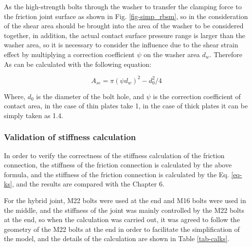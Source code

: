 As the high-strength bolts through the washer to transfer the clamping force to the friction joint surface as shown in Fig. \ref{fig-simp_rbsm}, so in the consideration of the shear area should be brought into the area of the washer to be considered together, in addition, the actual contact surface pressure range is larger than the washer area, so it is necessary to consider the influence due to the shear strain effect by multiplying a correction coefficient $\psi$ on the washer area $d_w$.
Therefore As can be calculated with the following equation:

\begin{equation}
    A_{se} = \pi{(\psi d_w)^2-d_0^2} / 4
\end{equation}

Where, $d_0$ is the diameter of the bolt hole, and $\psi$ is the correction coefficient of contact area, in the case of thin plates take 1, in the case of thick plates it can be simply taken as 1.4.

\subsubsection{Validation of stiffness calculation}

In order to verify the correctness of the stiffness calculation of the friction connection, the stiffness of the friction connection is calculated by the above formula, and the stiffness of the friction connection is calculated by the Eq. \ref{eq-ks}, and the results are compared with the Chapter 6. 

For the hybrid joint, M22 bolts were used at the end and M16 bolts were used in the middle, and the stiffness of the joint was mainly controlled by the M22 bolts at the end, so when the calculation was carried out, it was agreed to follow the geometry of the M22 bolts at the end in order to facilitate the simplification of the model, and the details of the calculation are shown in Table \ref{tab-calks}.

